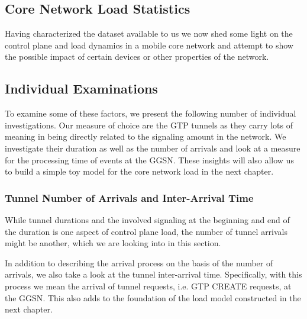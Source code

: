 \subsection{Core Network Load Statistics}

Having characterized the dataset available to us we now shed some light on the control plane and load dynamics in a mobile core network and attempt to show the possible impact of certain devices or other properties of the network. 




\subsection{Individual Examinations}

To examine some of these factors, we present the following number of individual investigations. Our measure of choice are the GTP tunnels as they carry lots of meaning in being directly related to the signaling amount in the network. We investigate their duration as well as the number of arrivals and look at a measure for the processing time of events at the GGSN. These insights will also allow us to build a simple toy model for the core network load in the next chapter.





\subsubsection{Tunnel Number of Arrivals and Inter-Arrival Time}

While tunnel durations and the involved signaling at the beginning and end of the duration is one aspect of control plane load, the number of tunnel arrivals might be another, which we are looking into in this section.

In addition to describing the arrival process on the basis of the number of arrivals, we also take a look at the tunnel inter-arrival time. Specifically, with this process we mean the arrival of tunnel requests, i.e. GTP CREATE requests, at the \gls{GGSN}. This also adds to the foundation of the load model constructed in the next chapter. 

